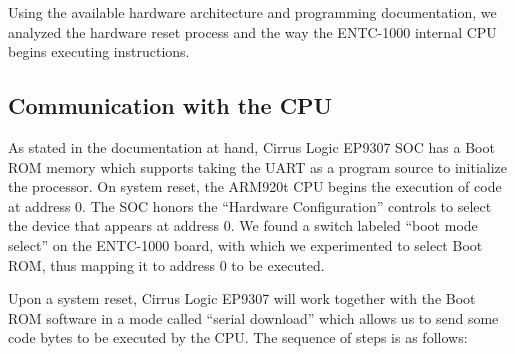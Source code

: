 \documentclass[conference]{IEEEtran}
\newcommand{\nota}[1]{}
\begin{document}
\nota {
Leyendo la documentación obtenida de la arquitectura y programación del hardware,
se analizó el proceso de reinicio del hardware y como la CPU interna
del ENTC-1000 comienza a ejecutar instrucciones.
}

Using the available hardware architecture and programming documentation, we analyzed the hardware reset process and the way the ENTC-1000 internal CPU begins executing instructions.

\subsection*{Communication with the CPU}

\nota{El SOC Cirrus EP9307 tiene una ROM de arranque\footnote{boot ROM}.
En un reinicio (en inglés reset) del SOC, la CPU (ARM920t) comienza a ejecutar código en la dirección cero.}

As stated in the documentation at hand, Cirrus Logic EP9307 SOC has a Boot ROM memory which supports taking the UART as a program source to initialize the processor. On system reset, the ARM920t CPU begins the execution of code at address 0. The SOC honors the ``Hardware Configuration'' controls to select the device that appears at address 0. We found a switch labeled ``boot mode select'' on the ENTC-1000 board, with which we experimented to select Boot ROM, thus mapping it to address 0 to be executed.

\nota{Por otro lado, el manual del SOC indica que éste utiliza los controles de la ``configuración del hardware'' para seleccionar qué dispositivo aparece en la dirección ``cero''. Al observar la placa ENTC-1000, se identificó un interruptor etiquetado como ``boot mode select''. Por lo que se procedió a experimentar con el mismo, con el objetivo de seleccionar el Boot ROM y así mapearlo a la dirección cero, y por ende, lograr su ejecución. }



\nota{Afortunadamente, en un reinicio, el Cirrus EP9307, en conjunción
con el software de la Boot ROM, operan en un modo llamado 
``download en serie'', que nos permite enviar unos pocos
bytes para ser ejecutados por la CPU. Internamente, en un evento de reinicio,
estos componentes (CPU y Boot ROM) trabajan de la siguiente manera:}

Upon a system reset, Cirrus Logic EP9307 will work together with the Boot ROM software in a mode called ``serial download'' which allows us to send some code bytes to be executed by the CPU. The sequence of steps is as follows:
\end{document}
